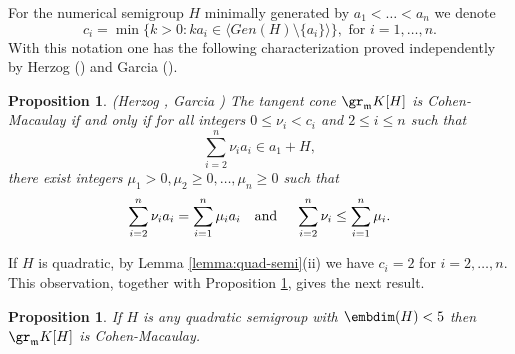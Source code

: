 \documentclass[12pt]{amsart}
\def\frk{\mathfrak}               %
\def\mm{{\frk m}}
\newtheorem{Proposition}[Theorem]{Proposition}
\begin{document}
For the numerical semigroup  $H$  minimally generated by $a_1<\dots <a_n$ we denote 
$$c_i= \min \{k>0: ka_i \in \langle Gen(H)\setminus\{a_i \}\rangle \}, \text{ for } i=1, \dots, n.
$$
With this notation one has the following characterization proved independently by Herzog (\cite{He-reg}) and Garcia (\cite{Garcia}).

\begin{Proposition}(Herzog \cite[pp.189-190]{He-reg}, Garcia \cite[Theorem 24]{Garcia})
\label{prop:cm-gr}
The tangent cone $\gr_\mm K[H]$ is  Cohen-Macaulay  if and only if for all  integers  $0\leq \nu_i < c_i$ and $2\leq i \leq n$ such that
$$
\sum_{i=2}^n \nu_i a_i \in a_1+H,
$$
there exist integers $\mu_1>0, \mu_2 \geq 0, \dots, \mu_n\geq 0$ such that
$$
\sum_{i=2}^n \nu_i a_i= \sum_{i=1}^n \mu_i a_i \text{\quad and \quad} \sum_{i=2}^n \nu_i \leq \sum_{i=1}^n \mu_i.
$$
\end{Proposition}

If $H$ is quadratic, by Lemma \ref{lemma:quad-semi}(ii) we have $c_i=2$ for $i=2, \dots, n$.
This observation, together with Proposition \ref{prop:cm-gr}, gives the next result.

\begin{Proposition}
\label{prop:cm-small-n}
If $H$ is any quadratic semigroup with $\embdim(H) <5$ then $\gr_\mm K[H]$ is Cohen-Macaulay. 
\end{Proposition}
\end{document}
